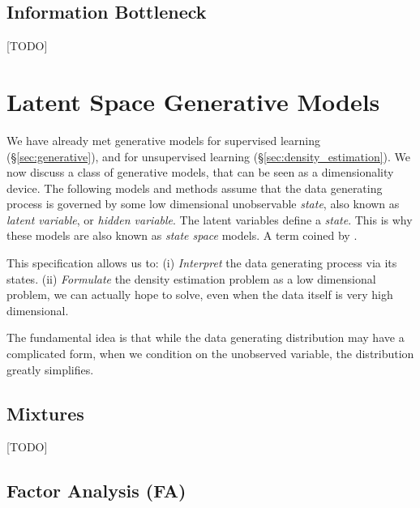 \subsection{Information Bottleneck}
[TODO]


\begin{remark}
\end{remark}








\section{Latent Space Generative Models}
\label{sec:latent_space}

We have already met generative models for supervised learning (\S\ref{sec:generative}), and for unsupervised learning (\S\ref{sec:density_estimation}).
We now discuss a class of generative models, that can be seen as a dimensionality device. 
The following models and methods assume that the data generating process is governed by some low dimensional unobservable \emph{state}, also known as \emph{latent variable}, or \emph{hidden variable}.
The latent variables define a \emph{state}. This is why these models are also known as \emph{state space} models. A term coined by \citet{kalman_contributions_1960}.

This specification allows us to:
(i) \emph{Interpret} the data generating process via its states. 
(ii) \emph{Formulate} the density estimation problem as a low dimensional problem, we can actually hope to solve, even when the data itself is very high dimensional.

The fundamental idea is that while the data generating distribution may have a complicated form, when we condition on the unobserved variable, the distribution greatly simplifies. 


\subsection{Mixtures}
[TODO]



\subsection{Factor Analysis (FA)}
\label{sec:factor_analysis}

